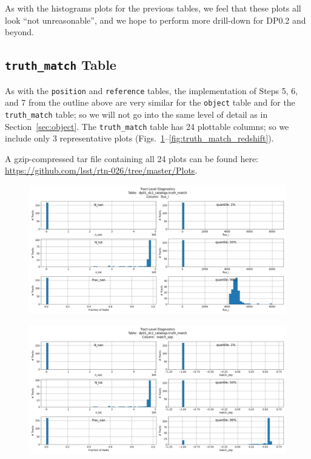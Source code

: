 \documentclass[DM,authoryear,toc]{lsstdoc}
\begin{document}
As with the histograms plots for the previous tables, we feel that
these plots all look ``not unreasonable'', and we hope to perform more
drill-down for DP0.2 and beyond.


\subsection{\texttt{truth\_match} Table} \label{sec:truth_match}

As with the \texttt{position} and \texttt{reference} tables, the
implementation of Steps 5, 6, and 7 from the outline above are very
similar for the \texttt{object} table and for the \texttt{truth\_match}
table; so we will not go into the same level of detail as in
Section~\ref{sec:object}.  The \texttt{truth\_match} table has 24
plottable columns; so we include only 3 representative plots
(Figs.~\ref{fig:truth_match_flux_i}--\ref{fig:truth_match_redshift}).

A gzip-compressed tar file containing all 24 plots can be found
here: \url{https://github.com/lsst/rtn-026/tree/master/Plots}.



\begin{figure}[h]
\centering
\includegraphics[width=1.0\linewidth]{Plots/TAP_verify_DP01.dp01_dc2_catalogs.truth_match.flux_i.pdf}
\caption{}
\label{fig:truth_match_flux_i}
\end{figure}

\begin{figure}[h]
\centering
\includegraphics[width=1.0\linewidth]{Plots/TAP_verify_DP01.dp01_dc2_catalogs.truth_match.match_sep.pdf}
\caption{}
\label{fig:truth_match_match_sep}
\end{figure}
\end{document}
